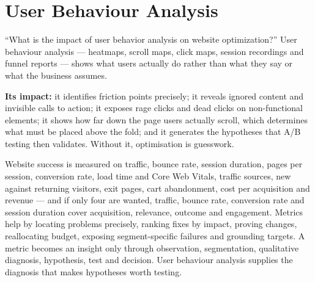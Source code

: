 \documentclass{MMTextbook}
\begin{document}
\section{User Behaviour Analysis}

\begin{exambox}
``What is the impact of user behavior analysis on website optimization?''
User behaviour analysis --- heatmaps, scroll maps, click maps, session recordings
and funnel reports --- shows what users actually do rather than what they say or
what the business assumes.

\smallskip
\textbf{Its impact:} it identifies friction points precisely; it reveals ignored
content and invisible calls to action; it exposes rage clicks and dead clicks on
non-functional elements; it shows how far down the page users actually scroll,
which determines what must be placed above the fold; and it generates the
hypotheses that A/B testing then validates. Without it, optimisation is
guesswork.
\end{exambox}

\begin{summarybox}
Website success is measured on traffic, bounce rate, session duration, pages per
session, conversion rate, load time and Core Web Vitals, traffic sources, new
against returning visitors, exit pages, cart abandonment, cost per acquisition and
revenue --- and if only four are wanted, traffic, bounce rate, conversion rate and
session duration cover acquisition, relevance, outcome and engagement. Metrics
help by locating problems precisely, ranking fixes by impact, proving changes,
reallocating budget, exposing segment-specific failures and grounding targets. A
metric becomes an insight only through observation, segmentation, qualitative
diagnosis, hypothesis, test and decision. User behaviour analysis supplies the
diagnosis that makes hypotheses worth testing.
\end{summarybox}




\backmatter
\printindex
\end{document}
